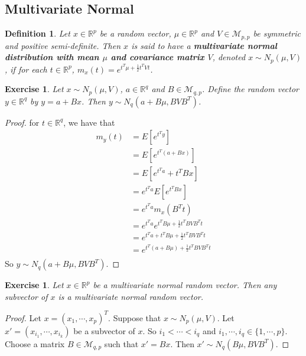 \documentclass[12pt]{amsart}
\newtheorem{defn}[thm]{Definition}
\newtheorem{ex}[thm]{Exercise}
\newcommand{\R}{\mathbb{R}}
\newcommand{\MM}{\mathcal{M}}
\begin{document}
\subsection{Multivariate Normal}



\begin{defn}
Let $x \in \R^p$ be a random vector, $\mu \in \R^p$ and $V \in \MM_{p, p}$ be symmetric and positive semi-definite. Then $x$ is said to have a \textbf{multivariate normal distribution with mean $\mu$ and covariance matrix $V$}, denoted $x \sim N_{p}(\mu, V)$, if for each $t \in \R^p$, $m_x(t) = e^{t^T\mu + \frac{1}{2} t^T V t}$.
\end{defn}

\begin{ex}
Let $x \sim N_p(\mu, V)$, $a \in \R^q$ and $B \in \MM_{q, p}$. Define the random vector $y \in \R^q$ by  $y = a +Bx$. Then $y \sim N_q(a + B\mu, BVB^T)$. 
\end{ex}

\begin{proof} 
for $t \in \R^q$, we have that
\begin{align*}
m_y(t)
&= E[e^{t^Ty}] \\
&= E[e^{t^T(a+Bx)}] \\
&= E[e^{t^Ta} + t^TBx] \\
&= e^{t^Ta}E[e^{t^TBx}] \\
&= e^{t^Ta}m_x(B^Tt) \\
&= e^{t^Ta}e^{t^TB\mu + \frac{1}{2} t^TBVB^Tt} \\
&= e^{t^Ta + t^TB\mu + \frac{1}{2} t^TBVB^Tt} \\
&= e^{t^T(a + B\mu) + \frac{1}{2} t^TBVB^Tt} \\
\end{align*}
So $y \sim N_q(a+B\mu, BVB^T)$.
\end{proof}

\begin{ex}
Let $x \in \R^p$ be a multivariate normal random vector. Then any subvector of $x$ is a multivariate normal random vector.
\end{ex}

\begin{proof}
Let $x = (x_1, \cdots, x_p)^T$. Suppose that $x \sim N_p(\mu, V)$. Let $x' = (x_{i_1}, \cdots, x_{i_k})$ be a subvector of $x$. So $i_1 < \cdots < i_q$ and $i_1, \cdots, i_q\in \{1, \cdots, p\}$. Choose a matrix $B \in \MM_{q,p}$ such that $x' = Bx$. Then $x' \sim N_q(B\mu, BVB^T)$.
\end{proof}
\end{document}

